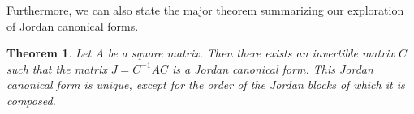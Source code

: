 \documentclass[11pt]{amsart}
\newtheorem{theorem}{Theorem}[section]
\theoremstyle{definition}
\begin{document}
Furthermore, we can also state the major theorem summarizing our exploration of Jordan canonical forms.
\begin{theorem}
	Let $A$ be a square matrix. Then there exists an invertible matrix $C$ such that the matrix $J = C^{-1}AC$ is a Jordan canonical form.
	This Jordan canonical form is unique, except for the order of the Jordan blocks of which it is composed.
\end{theorem}
\end{document}
